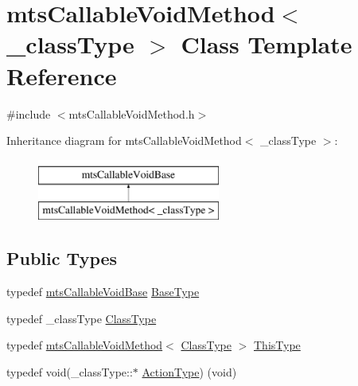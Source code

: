 \hypertarget{classmts_callable_void_method}{}\section{mts\+Callable\+Void\+Method$<$ \+\_\+class\+Type $>$ Class Template Reference}
\label{classmts_callable_void_method}


{\ttfamily \#include $<$mts\+Callable\+Void\+Method.\+h$>$}

Inheritance diagram for mts\+Callable\+Void\+Method$<$ \+\_\+class\+Type $>$\+:\begin{figure}[H]
\begin{center}
\leavevmode
\includegraphics[height=2.000000cm]{df/d97/classmts_callable_void_method}
\end{center}
\end{figure}
\subsection*{Public Types}
\begin{DoxyCompactItemize}
\item 
typedef \hyperlink{classmts_callable_void_base}{mts\+Callable\+Void\+Base} \hyperlink{classmts_callable_void_method_a5afd27bcc6880473f6e89e712a189afc}{Base\+Type}
\item 
typedef \+\_\+class\+Type \hyperlink{classmts_callable_void_method_a912290d7a57cc13fd33481e16d471467}{Class\+Type}
\item 
typedef \hyperlink{classmts_callable_void_method}{mts\+Callable\+Void\+Method}$<$ \hyperlink{classmts_callable_void_method_a912290d7a57cc13fd33481e16d471467}{Class\+Type} $>$ \hyperlink{classmts_callable_void_method_ae73e9f4d10f5be65841fac6109f48e0b}{This\+Type}
\item 
typedef void(\+\_\+class\+Type\+::$\ast$ \hyperlink{classmts_callable_void_method_af30fcc122aaea0b5870f22f57cf5e5ba}{Action\+Type}) (void)
\end{DoxyCompactItemize}
